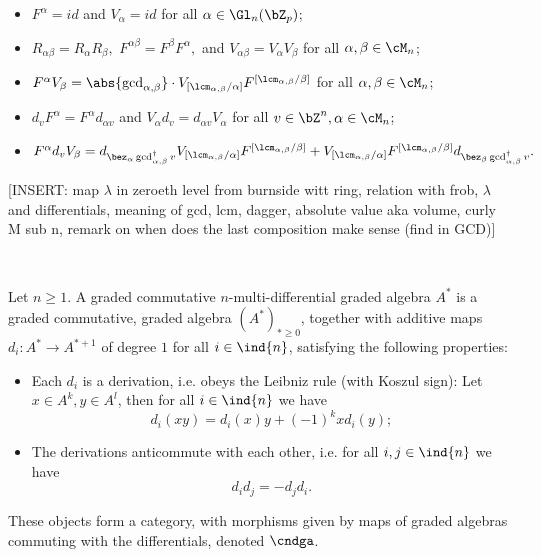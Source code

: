 \begin{thm}
\begin{itemize}
 \item $F^\alpha = id$ and $V_\alpha = id$ for all $\alpha \in \Gl_n(\bZ_p)$;
 \item $R_{\alpha\beta} = R_\alpha R_\beta,$ $F^{\alpha\beta} = F^\beta F^\alpha,$ and $V_{\alpha\beta} = V_\alpha V_\beta$ for all $\alpha, \beta \in \cM_n$;
 \item $F^\alpha V_\beta = \abs{\gcd_{\alpha,\beta}} \cdot V_{[\lcm_{\alpha,\beta} / \alpha]}F^{[\lcm_{\alpha,\beta} / \beta]}$ %
    for all $\alpha, \beta \in \cM_n$;
 \item $d_v F^\alpha = F^\alpha d_{\alpha v}$ and $V_\alpha d_v = d_{\alpha v} V_\alpha$ for all $v \in \bZ^n, \alpha \in \cM_n$;
 \item $F^\alpha d_v V_\beta = d_{\bez_{\alpha}\gcd_{\alpha,\beta}^\dagger v} %
    V_{[\lcm_{\alpha,\beta} / \alpha]} F^{[\lcm_{\alpha,\beta} / \beta]} + %
    V_{[\lcm_{\alpha,\beta} / \alpha]} F^{[\lcm_{\alpha,\beta} / \beta]}%
    d_{\bez_{\beta}\gcd_{\alpha,\beta}^\dagger v}.$
\end{itemize}
[INSERT: map $\lambda$ in zeroeth level from burnside witt ring, relation with frob, $\lambda$ and
differentials, meaning of gcd, lcm, dagger, absolute value aka volume, curly M sub n, remark on
when does the last composition make sense (find in GCD)]
\end{thm}
%
%
\begin{defn}\label{def_bwc}%
\\
\end{defn}
%
%
\begin{defn}\label{def_cmdga}
Let $n \geq 1$. A graded commutative $n$-multi-differential graded algebra $A^*$ is a graded commutative, graded algebra $(A^*)_{* \geq 0}$, together with additive maps $d_i: A^* \to A^{*+1}$ of degree $1$ for all $i \in \ind{n}$, satisfying the following properties:
\begin{itemize}
\item Each $d_i$ is a derivation, i.e. obeys the Leibniz rule (with Koszul sign): Let $x \in A^k, y \in A^l$, then for all $i \in \ind{n}$ we have%
$$d_i (xy) = d_i(x)y + (-1)^{k}xd_i(y);$$
\item The derivations anticommute with each other, i.e. for all $i,j \in \ind{n}$ we have%
$$d_i d_j = - d_j d_i.$$
\end{itemize}
These objects form a category, with morphisms given by maps of graded algebras commuting with the differentials, denoted $\cndga$.
\end{defn}

